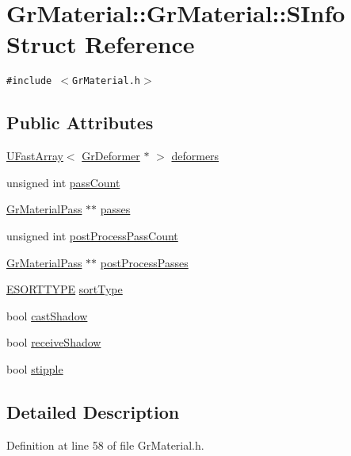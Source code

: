 \hypertarget{struct_gr_material_1_1_s_info}{
\section{GrMaterial::GrMaterial::SInfo Struct Reference}
\label{struct_gr_material_1_1_s_info}
}
{\tt \#include $<$GrMaterial.h$>$}

\subsection*{Public Attributes}
\begin{CompactItemize}
\item 
\hyperlink{class_u_fast_array}{UFastArray}$<$ \hyperlink{class_gr_deformer}{GrDeformer} $\ast$ $>$ \hyperlink{struct_gr_material_1_1_s_info_96cb5400adfde62d6b3580ff930012ef}{deformers}
\item 
unsigned int \hyperlink{struct_gr_material_1_1_s_info_d582f630813982a1a364956aa804ca82}{passCount}
\item 
\hyperlink{class_gr_material_pass}{GrMaterialPass} $\ast$$\ast$ \hyperlink{struct_gr_material_1_1_s_info_65b4844858083fced789f35b812d43a8}{passes}
\item 
unsigned int \hyperlink{struct_gr_material_1_1_s_info_1ce2cf4342c4ca673c726468213833d4}{postProcessPassCount}
\item 
\hyperlink{class_gr_material_pass}{GrMaterialPass} $\ast$$\ast$ \hyperlink{struct_gr_material_1_1_s_info_d0f2426e55d78a596ef62dd78624a180}{postProcessPasses}
\item 
\hyperlink{class_gr_material_0277ae85793f8cce8f8e3939fb5540e9}{ESORTTYPE} \hyperlink{struct_gr_material_1_1_s_info_26bcefa25e0ad2e18440c4c660fbc6bf}{sortType}
\item 
bool \hyperlink{struct_gr_material_1_1_s_info_f18b720a0aad7eae7be10f3b0622bd77}{castShadow}
\item 
bool \hyperlink{struct_gr_material_1_1_s_info_83ca23e73b506b9bdab98b43ab1bdf6f}{receiveShadow}
\item 
bool \hyperlink{struct_gr_material_1_1_s_info_67a1d89836a0e6033e8e65a4a13b6e67}{stipple}
\end{CompactItemize}


\subsection{Detailed Description}


Definition at line 58 of file GrMaterial.h.

